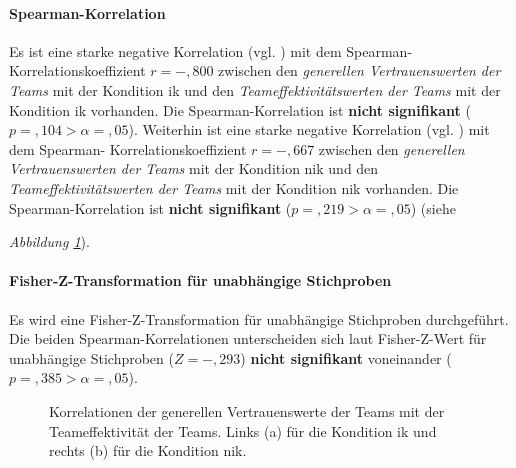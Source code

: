 \documentclass[a4paper,11pt]{article}%
\renewcommand{\\}{\vspace*{0.5\baselineskip} \newline}
\begin{document}
{{{{{{{{{{\paragraph{Spearman-Korrelation}
Es ist eine starke negative Korrelation (vgl. \citep{cohen2013statistical}) mit dem Spearman-Korrelationskoeffizient $r = -,800$ zwischen den \textit{generellen Vertrauenswerten der Teams} mit der Kondition \ac{ik} und den \textit{Teameffektivitätswerten der Teams} mit der Kondition \newline \ac{ik} vorhanden. Die Spearman-Korrelation ist \textbf{nicht signifikant} ($p =,104 > \alpha = ,05$).\\
Weiterhin ist eine starke negative Korrelation (vgl. \citep{cohen2013statistical}) mit dem Spearman- Korrelationskoeffizient $r = -,667$ zwischen den \textit{generellen Vertrauenswerten der Teams} mit der Kondition \ac{nik} und den \textit{Teameffektivitätswerten der Teams} mit der Kondition \newline \ac{nik} vorhanden. Die Spearman-Korrelation ist \textbf{nicht signifikant} ($p =,219 > \alpha = ,05$) (siehe {\textit{Abbildung \ref{H5_Korrelation_Auswertung}}). 

\paragraph{Fisher-Z-Transformation für unabhängige Stichproben}
Es wird eine Fisher-Z-Transformation für unabhängige Stichproben durchgeführt.
Die beiden Spearman-Korrelationen unterscheiden sich laut Fisher-Z-Wert für unabhängige Stichproben ($Z=-,293$) \textbf{nicht signifikant} voneinander ($p =,385 > \alpha = ,05$).

\begin{figure}[h]
  \centering
  \qquad
  \caption[Korrelationen der generellen Vertrauenswerte der Teams mit der Teameffektivität der Teams]{Korrelationen der generellen Vertrauenswerte der Teams mit der Teameffektivität der Teams. Links (a) für die Kondition \ac{ik} und rechts (b) für die Kondition \ac{nik}.}
  \label{H5_Korrelation_Auswertung}
\end{figure}

}}}}}}}}}}}
\end{document}
